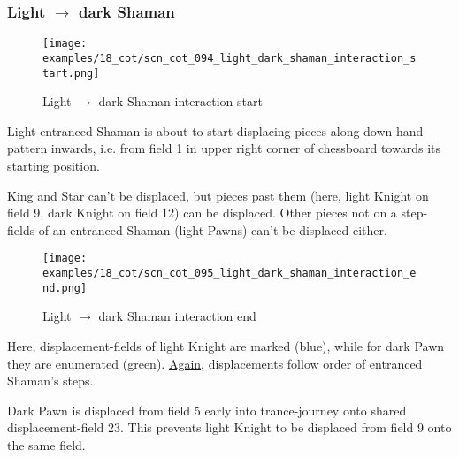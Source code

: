 \subsubsection*{Light $\rightarrow$ dark Shaman}
\label{sec:Conquest of Tlalocan/Trance-journey/Interactions/Light --> dark Shaman}

\vspace*{-1.5\baselineskip}
\noindent
\begin{figure}[!h]
\texttt{[image: examples/18\_cot/scn\_cot\_094\_light\_dark\_shaman\_interaction\_start.png]}
\vspace*{-1.4\baselineskip}
\caption{Light $\rightarrow$ dark Shaman interaction start}
\label{fig:scn_cot_094_light_dark_shaman_interaction_start}
\end{figure}

\vspace*{-0.5\baselineskip}
Light-entranced Shaman is about to start displacing pieces along down-hand pattern
inwards, i.e. from field 1 in upper right corner of chessboard towards its starting
position.

King and Star can't be displaced, but pieces past them (here, light Knight on field 9,
dark Knight on field 12) can be displaced. Other pieces not on a step-fields of an
entranced Shaman (light Pawns) can't be displaced either.

\clearpage %

\noindent
\begin{figure}[!h]
\texttt{[image: examples/18\_cot/scn\_cot\_095\_light\_dark\_shaman\_interaction\_end.png]}
\caption{Light $\rightarrow$ dark Shaman interaction end}
\label{fig:scn_cot_095_light_dark_shaman_interaction_end}
\end{figure}

Here, displacement-fields of light Knight are marked (blue), while for dark Pawn
they are enumerated (green).
\hyperref[fig:scn_cot_087_light_light_shaman_interaction_end]{Again}, displacements
follow order of entranced Shaman's steps.

Dark Pawn is displaced from field 5 early into trance-journey onto shared
displacement-field 23. This prevents light Knight to be displaced from field 9
onto the same field.

\clearpage %

